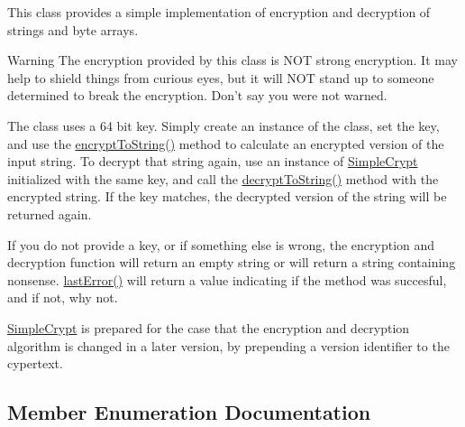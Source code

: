 This class provides a simple implementation of encryption and decryption of strings and byte arrays.

\begin{DoxyWarning}{Warning}
The encryption provided by this class is N\+O\+T strong encryption. It may help to shield things from curious eyes, but it will N\+O\+T stand up to someone determined to break the encryption. Don't say you were not warned.
\end{DoxyWarning}
The class uses a 64 bit key. Simply create an instance of the class, set the key, and use the \hyperlink{class_simple_crypt_af26a3d3c6cef9732190c1d2c6a53a5b5}{encrypt\+To\+String()} method to calculate an encrypted version of the input string. To decrypt that string again, use an instance of \hyperlink{class_simple_crypt}{Simple\+Crypt} initialized with the same key, and call the \hyperlink{class_simple_crypt_aa454cf372b534fd5ffaa2c5bd0fa57ea}{decrypt\+To\+String()} method with the encrypted string. If the key matches, the decrypted version of the string will be returned again.

If you do not provide a key, or if something else is wrong, the encryption and decryption function will return an empty string or will return a string containing nonsense. \hyperlink{class_simple_crypt_a123562e29377ab26e3b398b588f596d9}{last\+Error()} will return a value indicating if the method was succesful, and if not, why not.

\hyperlink{class_simple_crypt}{Simple\+Crypt} is prepared for the case that the encryption and decryption algorithm is changed in a later version, by prepending a version identifier to the cypertext. 

\subsection{Member Enumeration Documentation}
\hypertarget{class_simple_crypt_a25298e746f175cf175a18f082092ca8e}{}
